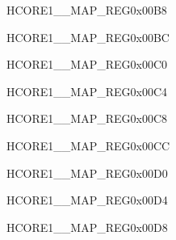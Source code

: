 \begin{register}{H}{CORE1\_\_MAP\_REG}{0x00B8}\label{regdesc:CORE1TIMERGRP0T0INTMAPREG}
\end{register}\vspace{-3em}


\begin{register}{H}{CORE1\_\_MAP\_REG}{0x00BC}\label{regdesc:CORE1TIMERGRP0T1INTMAPREG}
\end{register}\vspace{-3em}


\begin{register}{H}{CORE1\_\_MAP\_REG}{0x00C0}\label{regdesc:CORE1TIMERGRP0WDTINTMAPREG}
\end{register}\vspace{-3em}


\begin{register}{H}{CORE1\_\_MAP\_REG}{0x00C4}\label{regdesc:CORE1TIMERGRP1T0INTMAPREG}
\end{register}\vspace{-3em}


\begin{register}{H}{CORE1\_\_MAP\_REG}{0x00C8}\label{regdesc:CORE1TIMERGRP1T1INTMAPREG}
\end{register}\vspace{-3em}


\begin{register}{H}{CORE1\_\_MAP\_REG}{0x00CC}\label{regdesc:CORE1TIMERGRP1WDTINTMAPREG}
\end{register}\vspace{-3em}


\begin{register}{H}{CORE1\_\_MAP\_REG}{0x00D0}\label{regdesc:CORE1LEDCINTMAPREG}
\end{register}\vspace{-3em}


\begin{register}{H}{CORE1\_\_MAP\_REG}{0x00D4}\label{regdesc:CORE1SYSTIMERTARGET0INTMAPREG}
\end{register}\vspace{-3em}


\begin{register}{H}{CORE1\_\_MAP\_REG}{0x00D8}\label{regdesc:CORE1SYSTIMERTARGET1INTMAPREG}
\end{register}\vspace{-3em}


